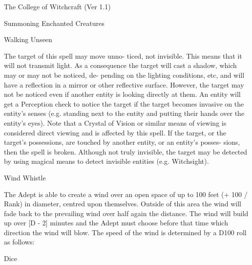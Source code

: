 \begin{Chapter}{The College of Witchcraft (Ver 1.1)}
\begin{spell}[G-11]{Summoning Enchanted Creatures }
\begin{effects}
\end{effects}
\end{spell}

\begin{spell}[G-12]{Walking Unseen }

\begin{effects}
 The  target  of  this  spell  may  move  unno-
ticed,  not  invisible.  This  means  that  it  will  not 
transmit light. As a consequence the target will cast 
a  shadow,  which  may  or  may  not  be  noticed,  de-
pending  on  the  lighting  conditions,  etc,  and  will 
have  a  reflection  in  a  mirror  or  other  reflective 
surface.  However,  the  target  may  not  be  noticed 
even  if  another  entity  is  looking  directly  at  them. 
An entity will get a Perception check to notice the 
target if the target becomes invasive on the entity’s 
senses (e.g. standing next to the entity and putting 
their  hands  over  the  entity’s  eyes).  Note  that  a 
Crystal  of  Vision  or  similar  means  of  viewing  is 
considered  direct  viewing  and  is  affected  by  this 
spell.  If  the  target,  or  the  target’s  possessions,  are 
touched  by  another  entity,  or  an  entity’s  posses-
sions,  then  the  spell  is  broken.  Although  not  truly 
invisible,  the  target  may  be  detected  by  using 
magical  means  to  detect  invisible  entities  (e.g. 
Witchsight). 

\end{effects}
\end{spell}

\begin{spell}[G-13]{Wind Whistle }

\begin{effects}
The Adept is able to create a wind over an 
open  space  of  up  to  100  feet  (+  100  /  Rank)  in 
diameter, centred upon themselves. Outside of this 
area the wind will fade back to the prevailing wind 
over half again the distance. The wind will build up 
over  [D  -  2]  minutes  and  the  Adept  must  choose 
before  that  time  which  direction  the  wind  will 
blow.  The  speed  of  the  wind  is  determined  by  a 
D100 roll as follows: 

Dice 


\end{effects}
\end{spell}
\end{Chapter}
